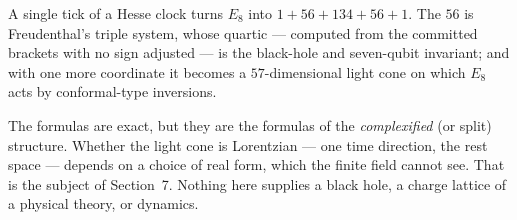 \begin{keyidea}
A single tick of a Hesse clock turns $E_8$ into $1+56+134+56+1$. The $56$ is Freudenthal's
triple system, whose quartic --- computed from the committed brackets with no sign
adjusted --- is the black-hole and seven-qubit invariant; and with one more coordinate it
becomes a $57$-dimensional light cone on which $E_8$ acts by conformal-type inversions.
\end{keyidea}

\begin{boundary}
The formulas are exact, but they are the formulas of the \emph{complexified} (or split)
structure. Whether the light cone is Lorentzian --- one time direction, the rest space ---
depends on a choice of real form, which the finite field cannot see. That is the subject
of Section~7. Nothing here supplies a black hole, a charge lattice of a physical theory, or
dynamics. \tierO
\end{boundary}
